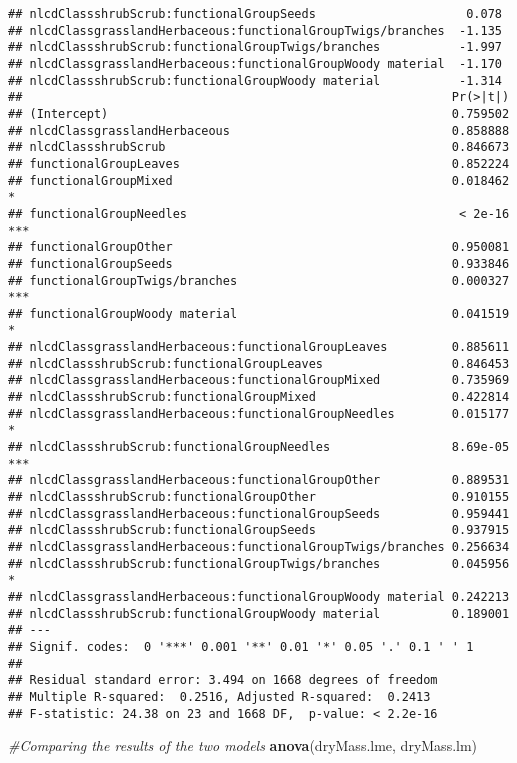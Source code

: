 \documentclass[]{article}
\newenvironment{Shaded}{\begin{snugshade}}{\end{snugshade}}
\newcommand{\CommentTok}[1]{\textcolor[rgb]{0.56,0.35,0.01}{\textit{#1}}}
\newcommand{\KeywordTok}[1]{\textcolor[rgb]{0.13,0.29,0.53}{\textbf{#1}}}
\newcommand{\NormalTok}[1]{#1}
\begin{document}
\begin{verbatim}
## nlcdClassshrubScrub:functionalGroupSeeds                     0.078
## nlcdClassgrasslandHerbaceous:functionalGroupTwigs/branches  -1.135
## nlcdClassshrubScrub:functionalGroupTwigs/branches           -1.997
## nlcdClassgrasslandHerbaceous:functionalGroupWoody material  -1.170
## nlcdClassshrubScrub:functionalGroupWoody material           -1.314
##                                                            Pr(>|t|)    
## (Intercept)                                                0.759502    
## nlcdClassgrasslandHerbaceous                               0.858888    
## nlcdClassshrubScrub                                        0.846673    
## functionalGroupLeaves                                      0.852224    
## functionalGroupMixed                                       0.018462 *  
## functionalGroupNeedles                                      < 2e-16 ***
## functionalGroupOther                                       0.950081    
## functionalGroupSeeds                                       0.933846    
## functionalGroupTwigs/branches                              0.000327 ***
## functionalGroupWoody material                              0.041519 *  
## nlcdClassgrasslandHerbaceous:functionalGroupLeaves         0.885611    
## nlcdClassshrubScrub:functionalGroupLeaves                  0.846453    
## nlcdClassgrasslandHerbaceous:functionalGroupMixed          0.735969    
## nlcdClassshrubScrub:functionalGroupMixed                   0.422814    
## nlcdClassgrasslandHerbaceous:functionalGroupNeedles        0.015177 *  
## nlcdClassshrubScrub:functionalGroupNeedles                 8.69e-05 ***
## nlcdClassgrasslandHerbaceous:functionalGroupOther          0.889531    
## nlcdClassshrubScrub:functionalGroupOther                   0.910155    
## nlcdClassgrasslandHerbaceous:functionalGroupSeeds          0.959441    
## nlcdClassshrubScrub:functionalGroupSeeds                   0.937915    
## nlcdClassgrasslandHerbaceous:functionalGroupTwigs/branches 0.256634    
## nlcdClassshrubScrub:functionalGroupTwigs/branches          0.045956 *  
## nlcdClassgrasslandHerbaceous:functionalGroupWoody material 0.242213    
## nlcdClassshrubScrub:functionalGroupWoody material          0.189001    
## ---
## Signif. codes:  0 '***' 0.001 '**' 0.01 '*' 0.05 '.' 0.1 ' ' 1
## 
## Residual standard error: 3.494 on 1668 degrees of freedom
## Multiple R-squared:  0.2516, Adjusted R-squared:  0.2413 
## F-statistic: 24.38 on 23 and 1668 DF,  p-value: < 2.2e-16
\end{verbatim}

\begin{Shaded}
\begin{Highlighting}[]
\CommentTok{#Comparing the results of the two models}
\KeywordTok{anova}\NormalTok{(dryMass.lme, dryMass.lm)}
\end{Highlighting}
\end{Shaded}
\end{document}
